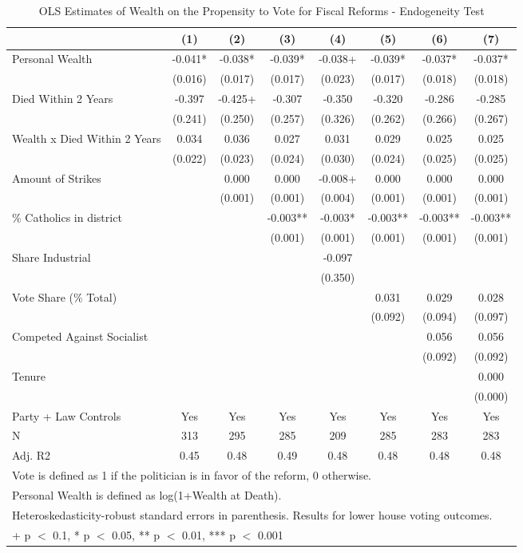 \begin{table}

\caption{\label{tab:harnas2}OLS Estimates of Wealth on the Propensity to Vote for Fiscal Reforms - Endogeneity Test}
\centering
\begin{tabular}[t]{lccccccc}
\toprule
  & (1) & (2) & (3) & (4) & (5) & (6) & (7)\\
\midrule
Personal Wealth & -0.041* & -0.038* & -0.039* & -0.038+ & -0.039* & -0.037* & -0.037*\\
 & (0.016) & (0.017) & (0.017) & (0.023) & (0.017) & (0.018) & (0.018)\\
Died Within 2 Years & -0.397 & -0.425+ & -0.307 & -0.350 & -0.320 & -0.286 & -0.285\\
 & (0.241) & (0.250) & (0.257) & (0.326) & (0.262) & (0.266) & (0.267)\\
Wealth x Died Within 2 Years & 0.034 & 0.036 & 0.027 & 0.031 & 0.029 & 0.025 & 0.025\\
 & (0.022) & (0.023) & (0.024) & (0.030) & (0.024) & (0.025) & (0.025)\\
Amount of Strikes &  & 0.000 & 0.000 & -0.008+ & 0.000 & 0.000 & 0.000\\
 &  & (0.001) & (0.001) & (0.004) & (0.001) & (0.001) & (0.001)\\
\% Catholics in district &  &  & -0.003** & -0.003* & -0.003** & -0.003** & -0.003**\\
 &  &  & (0.001) & (0.001) & (0.001) & (0.001) & (0.001)\\
Share Industrial &  &  &  & -0.097 &  &  & \\
 &  &  &  & (0.350) &  &  & \\
Vote Share (\% Total) &  &  &  &  & 0.031 & 0.029 & 0.028\\
 &  &  &  &  & (0.092) & (0.094) & (0.097)\\
Competed Against Socialist &  &  &  &  &  & 0.056 & 0.056\\
 &  &  &  &  &  & (0.092) & (0.092)\\
Tenure &  &  &  &  &  &  & 0.000\\
 &  &  &  &  &  &  & (0.000)\\
\midrule
Party + Law Controls & Yes & Yes & Yes & Yes & Yes & Yes & Yes\\
N & 313 & 295 & 285 & 209 & 285 & 283 & 283\\
Adj. R2 & 0.45 & 0.48 & 0.49 & 0.48 & 0.48 & 0.48 & 0.48\\
\bottomrule
\multicolumn{8}{l}{\rule{0pt}{1em}Vote is defined as 1 if the politician is in favor of the reform, 0 otherwise.}\\
\multicolumn{8}{l}{\rule{0pt}{1em}Personal Wealth is defined as log(1+Wealth at Death).}\\
\multicolumn{8}{l}{\rule{0pt}{1em}Heteroskedasticity-robust standard errors in parenthesis. Results for lower house voting outcomes.}\\
\multicolumn{8}{l}{\rule{0pt}{1em}+ p $<$ 0.1, * p $<$ 0.05, ** p $<$ 0.01, *** p $<$ 0.001}\\
\end{tabular}
\end{table}
